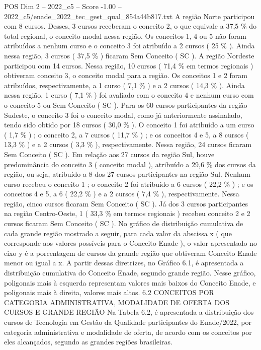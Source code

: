\begin{textsample}{POS Dim 2 – 2022\_c5 – Score -1.00 – 2022\_c5/enade\_2022\_tec\_gest\_qual\_854a44b817.txt}
A região Norte participou com 8 cursos.
Desses, 3 cursos receberam o conceito 2, o que equivale a 37,5 \% do total regional, o conceito modal nessa região.
Os conceitos 1, 4 ou 5 não foram atribuídos a nenhum curso e o conceito 3 foi atribuído a 2 cursos ( 25 \% ).
Ainda nessa região, 3 cursos ( 37,5 \% ) ficaram Sem Conceito ( SC ).
A região Nordeste participou com 14 cursos.
Nessa região, 10 cursos ( 71,4 \% em termos regionais ) obtiveram conceito 3, o conceito modal para a região.
Os conceitos 1 e 2 foram atribuídos, respectivamente, a 1 curso ( 7,1 \% ) e a 2 cursos ( 14,3 \% ).
Ainda nessa região, 1 curso ( 7,1 \% ) foi avaliado com o conceito 4 e nenhum curso com o conceito 5 ou Sem Conceito ( SC ).
Para os 60 cursos participantes da região Sudeste, o conceito 3 foi o conceito modal, como já anteriormente assinalado, tendo sido obtido por 18 cursos ( 30,0 \% ).
O conceito 1 foi atribuído a um curso ( 1,7 \% ) ; o conceito 2, a 7 cursos ( 11,7 \% ) ; e os conceitos 4 e 5, a 8 cursos ( 13,3 \% ) e a 2 cursos ( 3,3 \% ), respectivamente.
Nessa região, 24 cursos ficaram Sem Conceito ( SC ).
Em relação aos 27 cursos da região Sul, houve predominância do conceito 3 ( conceito modal ), atribuído a 29,6 \% dos cursos da região, ou seja, atribuído a 8 dos 27 cursos participantes na região Sul.
Nenhum curso recebeu o conceito 1 ; o conceito 2 foi atribuído a 6 cursos ( 22,2 \% ) ; e os conceitos 4 e 5, a 6 ( 22,2 \% ) e a 2 cursos ( 7,4 \% ), respectivamente.
Nessa região, cinco cursos ficaram Sem Conceito ( SC ).
Já dos 3 cursos participantes na região Centro-Oeste, 1 ( 33,3 \% em termos regionais ) recebeu conceito 2 e 2 cursos ficaram Sem Conceito ( SC ).
No gráfico de distribuição cumulativa de cada grande região mostrado a seguir, para cada valor da abscissa x ( que corresponde aos valores possíveis para o Conceito Enade ), o valor apresentado no eixo y é a porcentagem de cursos da grande região que obtiveram Conceito Enade menor ou igual a x.
A partir dessas diretrizes, no Gráfico 6.1, é apresentada a distribuição cumulativa do Conceito Enade, segundo grande região.
Nesse gráfico, poligonais mais à esquerda representam valores mais baixos do Conceito Enade, e poligonais mais à direita, valores mais altos. 6.2 CONCEITOS POR CATEGORIA ADMINISTRATIVA, MODALIDADE DE OFERTA DOS CURSOS E GRANDE REGIÃO Na Tabela 6.2, é apresentada a distribuição dos cursos de Tecnologia em Gestão da Qualidade participantes do Enade/2022, por categoria administrativa e modalidade de oferta, de acordo com os conceitos por eles alcançados, segundo as grandes regiões brasileiras.

\end{textsample}
